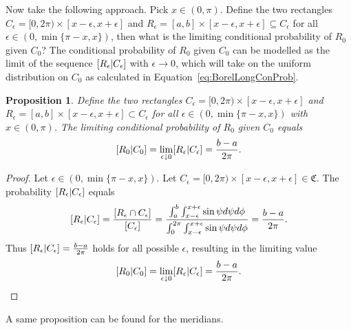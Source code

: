 \documentclass[a4paper]{report}
\theoremstyle{plain}
\newtheorem{proposition}[theorem]{Proposition}
\theoremstyle{definition}
\theoremstyle{remark}
\numberwithin{equation}{chapter}
\let\P\relax
\DeclareMathOperator{\P}{\mathbb{P}}
\DeclareMathOperator{\1}{\mathbbm{1}}
\begin{document}
Now take the following approach. Pick $x\in(0,\pi)$. Define the two rectangles $C_\epsilon=[0,2\pi)\times[x-\epsilon,x+\epsilon]$ and $R_\epsilon=[a,b]\times[x-\epsilon,x+\epsilon]\subseteq C_\epsilon$ for all ${\epsilon\in(0,\min\{\pi-x,x\})}$, then what is the limiting conditional probability of $R_0$ given $C_0$? The conditional probability of $R_0$ given $C_0$ can be modelled as the limit of the sequence $\P[R_\epsilon|C_\epsilon]$ with $\epsilon\to0$, which will take on the uniform distribution on $C_0$ as calculated in Equation~\ref{eq:BorelLongConProb}.
\begin{proposition}\label{prop:BorelLongBayes}
Define the two rectangles $C_\epsilon=[0,2\pi)\times[x-\epsilon,x+\epsilon]$ and $R_\epsilon=[a,b]\times[x-\epsilon,x+\epsilon]\subset C_\epsilon$ for all $\epsilon\in(0,\min\{\pi-x,x\})$ with $x\in(0,\pi)$. The limiting conditional probability of $R_0$ given $C_0$ equals
\begin{equation}
\P[R_0|C_0]=\lim_{\epsilon\downarrow0}\P[R_\epsilon|C_\epsilon]=\frac{b-a}{2\pi}.
\end{equation}
\end{proposition}
\begin{proof}
Let $\epsilon\in(0,\min\{\pi-x,x\})$. Let $C_\epsilon=[0,2\pi)\times[x-\epsilon,x+\epsilon]\in\mathfrak{C}$. The probability $\P[R_\epsilon|C_\epsilon]$ equals
\begin{equation}
\P[R_\epsilon|C_\epsilon]=\frac{\P[R_\epsilon\cap C_\epsilon]}{\P[C_\epsilon]}=\frac{\int_{a}^{b}\int_{x-\epsilon}^{x+\epsilon}\sin\psi d\psi d\phi}{\int_{0}^{2\pi}\int_{x-\epsilon}^{x+\epsilon}\sin\psi d\psi d\phi}=\frac{b-a}{2\pi}.
\end{equation}
Thus $\P[R_\epsilon|C_\epsilon]=\frac{b-a}{2\pi}$ holds for all possible $\epsilon$, resulting in the limiting value
\begin{equation}
\P[R_0|C_0]=\lim_{\epsilon\downarrow0}\P[R_\epsilon|C_\epsilon]=\frac{b-a}{2\pi}.
\end{equation}
\end{proof}

A same proposition can be found for the meridians.
\end{document}
